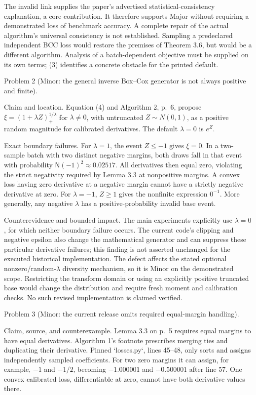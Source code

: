 \documentclass[10pt]{article}
\begin{document}
The invalid link supplies the paper’s advertised statistical-consistency explanation, a core contribution. It therefore supports Major without requiring a demonstrated loss of benchmark accuracy. A complete repair of the actual algorithm’s universal consistency is not established. Sampling a predeclared independent BCC loss would restore the premises of Theorem 3.6, but would be a different algorithm. Analysis of a batch-dependent objective must be supplied on its own terms; (3) identifies a concrete obstacle for the printed default.\par
Problem 2 (Minor: the general inverse Box–Cox generator is not always positive and finite).\par
Claim and location. Equation (4) and Algorithm 2, p. 6, propose \(\xi=(1+\lambda Z)_+^{1/\lambda}\) for \(\lambda\ne0\), with untruncated \(Z\sim N(0,1)\), as a positive random magnitude for calibrated derivatives. The default \(\lambda=0\) is \(e^Z\).\par
Exact boundary failures. For \(\lambda=1\), the event \(Z\le-1\) gives \(\xi=0\). In a two-sample batch with two distinct negative margins, both draws fall in that event with probability \(\mathsf N(-1)^2\approx0.02517\). All derivatives then equal zero, violating the strict negativity required by Lemma 3.3 at nonpositive margins. A convex loss having zero derivative at a negative margin cannot have a strictly negative derivative at zero. For \(\lambda=-1\), \(Z\ge1\) gives the nonfinite expression \(0^{-1}\). More generally, any negative \(\lambda\) has a positive-probability invalid base event.\par
Counterevidence and bounded impact. The main experiments explicitly use \(\lambda=0\), for which neither boundary failure occurs. The current code’s clipping and negative epsilon also change the mathematical generator and can suppress these particular derivative failures; this finding is not asserted unchanged for the executed historical implementation. The defect affects the stated optional nonzero/random-\(\lambda\) diversity mechanism, so it is Minor on the demonstrated scope. Restricting the transform domain or using an explicitly positive truncated base would change the distribution and require fresh moment and calibration checks. No such revised implementation is claimed verified.\par
Problem 3 (Minor: the current release omits required equal-margin handling).\par
Claim, source, and counterexample. Lemma 3.3 on p. 5 requires equal margins to have equal derivatives. Algorithm 1’s footnote prescribes merging ties and duplicating their derivative. Pinned `losses.py`, lines 45–48, only sorts and assigns independently sampled coefficients. For two zero margins it can assign, for example, \(-1\) and \(-1/2\), becoming \(-1.000001\) and \(-0.500001\) after line 57. One convex calibrated loss, differentiable at zero, cannot have both derivative values there.\par
\end{document}
